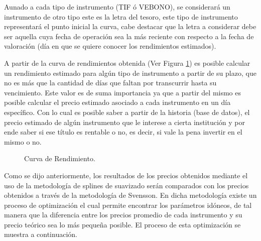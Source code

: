 \hspace{0.4cm} Aunado a cada tipo de instrumento (TIF \'o VEBONO), se considerar\'a un instrumento de otro tipo este es la letra del tesoro, este tipo de instrumento representar\'a el punto inicial la curva, cabe destacar que la letra a considerar debe ser aquella cuya fecha de operaci\'on sea la m\'as reciente con respecto a la fecha de valoraci\'on (d\'ia en que se quiere conocer los rendimientos estimados).


\hspace{0.4cm} A partir de la curva de rendimientos obtenida (Ver Figura \ref{c_rend}) es posible calcular un rendimiento estimado para alg\'un tipo de instrumento a partir de su plazo, que no es m\'as que la cantidad de d\'ias que faltan por transcurrir hasta su vencimiento. Este valor es de suma importancia ya que a partir del mismo es posible calcular el precio estimado asociado a cada instrumento en un d\'ia espec\'ifico. Con lo cual es posible saber a partir de la historia (base de datos), el precio estimado de alg\'un instrumento que le interese a cierta instituci\'on y por ende saber si ese t\'itulo es rentable o no, es decir, si vale la pena invertir en el mismo o no.

\begin{figure}[h]
\caption{Curva de Rendimiento.}
\label{c_rend}
\end{figure}

\hspace{0.4cm} Como se dijo anteriormente, los resultados de los precios obtenidos mediante el uso de la metodolog\'ia de splines de suavizado ser\'an comparados con los precios obtenidos a trav\'es de la metodolog\'ia de Svensson. En dicha metodolog\'ia existe un proceso de optimizaci\'on el cual permite encontrar los par\'ametros id\'oneos, de tal manera que la diferencia entre los precios promedio de cada instrumento y su precio te\'orico sea lo m\'as peque\~na posible. El proceso de esta optimizaci\'on se muestra a continuaci\'on.



